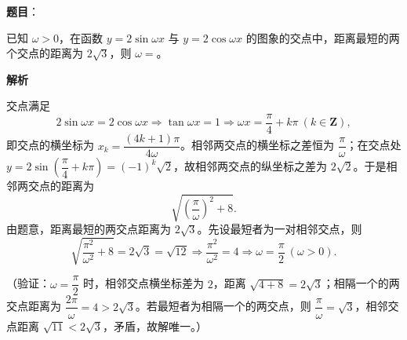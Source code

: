 \begin{answer}

\textbf{题目}：

已知 \(\omega>0\)，在函数 \(y=2\sin\omega x\) 与 \(y=2\cos\omega x\) 的图象的交点中，距离最短的两个交点的距离为 \(2\sqrt3\)，则 \(\omega=\)\gkblank{}。

\textbf{解析}

交点满足
\nopagebreak[4]
\[
2\sin\omega x=2\cos\omega x
\Longrightarrow \tan\omega x=1
\Longrightarrow \omega x=\dfrac{\pi}{4}+k\pi\ (k\in\mathbf{Z}),
\]
即交点的横坐标为 \(x_k=\dfrac{(4k+1)\pi}{4\omega}\)。相邻两交点的横坐标之差恒为 \(\dfrac{\pi}{\omega}\)；在交点处 \(y=2\sin\left(\dfrac{\pi}{4}+k\pi\right)=(-1)^k\sqrt2\)，故相邻两交点的纵坐标之差为 \(2\sqrt2\)。于是相邻两交点的距离为
\nopagebreak[4]
\[
\sqrt{\left(\dfrac{\pi}{\omega}\right)^2+8}.
\]
由题意，距离最短的两交点距离为 \(2\sqrt3\)。先设最短者为一对相邻交点，则
\nopagebreak[4]
\[
\sqrt{\dfrac{\pi^2}{\omega^2}+8}=2\sqrt3=\sqrt{12}
\Longrightarrow \dfrac{\pi^2}{\omega^2}=4
\Longrightarrow \omega=\dfrac{\pi}{2}\ (\omega>0).
\]

（验证：\(\omega=\dfrac{\pi}{2}\) 时，相邻交点横坐标差为 \(2\)，距离 \(\sqrt{4+8}=2\sqrt3\)；相隔一个的两交点距离为 \(\dfrac{2\pi}{\omega}=4>2\sqrt3\)。若最短者为相隔一个的两交点，则 \(\dfrac{\pi}{\omega}=\sqrt3\)，相邻交点距离 \(\sqrt{11}<2\sqrt3\)，矛盾，故解唯一。）


\end{answer}
